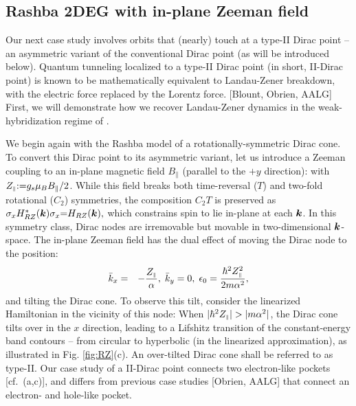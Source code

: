 \documentclass[aps, prb, showpacs, twocolumn, notitlepage, superscriptaddress]{revtex4-1}
\begin{document}
\subsection{Rashba 2DEG with in-plane Zeeman field}


Our next case study involves orbits that (nearly) touch at a type-II Dirac point -- an asymmetric variant of the conventional Dirac point (as will be introduced below). Quantum tunneling localized to a type-II Dirac point  (in short, II-Dirac point) is known to be mathematically equivalent to  Landau-Zener breakdown, with the electric force replaced by the Lorentz force. [Blount, Obrien, AALG] First, we will demonstrate how we recover Landau-Zener dynamics in the weak-hybridization regime  of . 


We begin again with the Rashba model of a rotationally-symmetric Dirac cone. To convert this Dirac point to its asymmetric variant, 
let us introduce a Zeeman coupling to an in-plane magnetic field $B_\parallel$ (parallel to the $+y$ direction):
with $Z_{\scriptscriptstyle{\parallel}}{:}{=}{g_s}\mu_B B_{\parallel}/2$.
While this field breaks both time-reversal ($T$) and two-fold rotational ($C_2$) symmetries, the composition $C_2T$ is preserved as $\sigma_x H^*_{RZ}(\boldsymbol{k})\sigma_x{=}H_{RZ}(\boldsymbol{k}),$ which constrains spin to lie in-plane at each $\boldsymbol{k}$. In this symmetry class, Dirac nodes are irremovable but movable   in two-dimensional $\boldsymbol{k}$-space. The in-plane Zeeman field has the dual effect of  moving the Dirac node  to the position:
\begin{eqnarray}
\bar{k}_x & = & -\frac{Z_{\scriptscriptstyle{\parallel}}}{\alpha},\;\bar{k}_y=0,\;\epsilon_{0}=\frac{{\hbar^2}Z_{\scriptscriptstyle{\parallel}}^{2}}{2m\alpha^2},\label{whereisdiracpoint}
\end{eqnarray}
and tilting the Dirac cone. To observe this tilt, consider the linearized Hamiltonian in the vicinity of this node: 
When $|\hbar^2\zpar|>|m\alpha^2|$, the Dirac cone tilts over in the $x$ direction, leading to a Lifshitz transition  of the constant-energy band contours -- from circular to hyperbolic (in the linearized approximation), as illustrated in Fig. \ref{fig:RZ}(c). An over-tilted Dirac cone shall be referred to as type-II. Our case study of a II-Dirac point  connects  two electron-like  pockets [cf.\ (a,c)], and  differs from previous case studies [Obrien, AALG] that connect an electron- and hole-like pocket.
\end{document}
